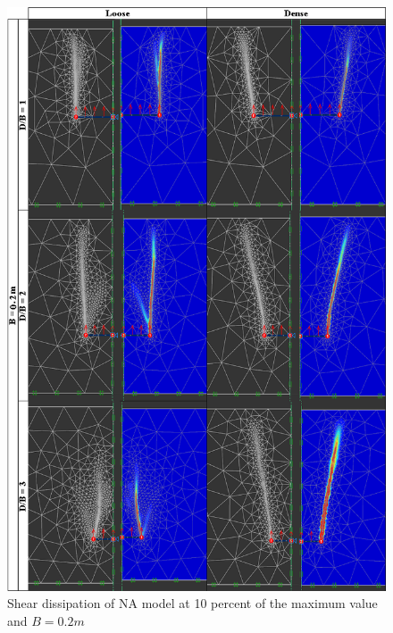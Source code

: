 \documentclass[a4paper, nobind]{templates/ociamthesis}
\begin{document}
\begin{figure}[H]
\includegraphics[width=1\linewidth]{myfigureeeeee/B_point_two_meter} \caption{Shear dissipation of NA model at 10 percent of the maximum value and $B = 0.2m$}\label{fig:unnamed-chunk-26}
\end{figure}
\end{document}
